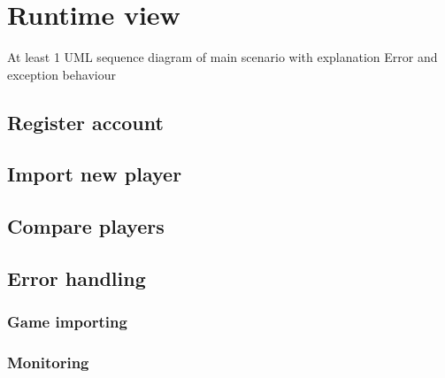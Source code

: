 \section{Runtime view}
At least 1 UML sequence diagram of main scenario with explanation
Error and exception behaviour
\subsection{Register account}

\subsection{Import new player}

\subsection{Compare players}

\subsection{Error handling}
\subsubsection{Game importing}
\subsubsection{Monitoring}